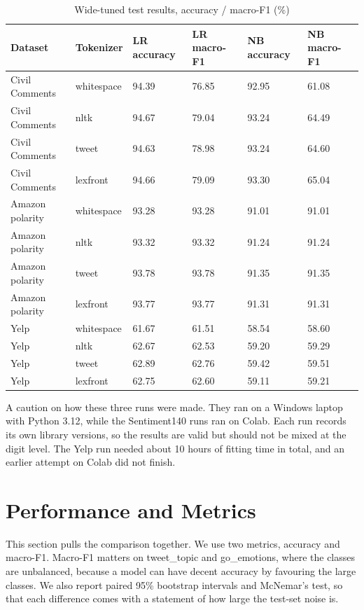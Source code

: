 \documentclass[journal,onecolumn,12pt,a4paper]{IEEEtran}
\begin{document}
\begin{table}[!tb]
\caption{Wide-tuned test results, accuracy / macro-F1 (\%)}\label{tab:12}
\centering
\footnotesize
\setlength{\tabcolsep}{4pt}
\begin{tabular}{llllll}
\toprule
\textbf{Dataset} & \textbf{Tokenizer} & \textbf{LR accuracy} & \textbf{LR macro-F1} & \textbf{NB accuracy} & \textbf{NB macro-F1} \\
\midrule
Civil Comments & whitespace & 94.39 & 76.85 & 92.95 & 61.08 \\
Civil Comments & nltk & 94.67 & 79.04 & 93.24 & 64.49 \\
Civil Comments & tweet & 94.63 & 78.98 & 93.24 & 64.60 \\
Civil Comments & lexfront & 94.66 & 79.09 & 93.30 & 65.04 \\
Amazon polarity & whitespace & 93.28 & 93.28 & 91.01 & 91.01 \\
Amazon polarity & nltk & 93.32 & 93.32 & 91.24 & 91.24 \\
Amazon polarity & tweet & 93.78 & 93.78 & 91.35 & 91.35 \\
Amazon polarity & lexfront & 93.77 & 93.77 & 91.31 & 91.31 \\
Yelp & whitespace & 61.67 & 61.51 & 58.54 & 58.60 \\
Yelp & nltk & 62.67 & 62.53 & 59.20 & 59.29 \\
Yelp & tweet & 62.89 & 62.76 & 59.42 & 59.51 \\
Yelp & lexfront & 62.75 & 62.60 & 59.11 & 59.21 \\
\bottomrule
\end{tabular}
\end{table}

A caution on how these three runs were made. They ran on a Windows laptop with Python 3.12, while the Sentiment140 runs ran on Colab. Each run records its own library versions, so the results are valid but should not be mixed at the digit level. The Yelp run needed about 10 hours of fitting time in total, and an earlier attempt on Colab did not finish.

\section{Performance and Metrics}\label{sec:5}
This section pulls the comparison together. We use two metrics, accuracy and macro-F1. Macro-F1 matters on tweet\_topic and go\_emotions, where the classes are unbalanced, because a model can have decent accuracy by favouring the large classes. We also report paired 95\% bootstrap intervals and McNemar's test, so that each difference comes with a statement of how large the test-set noise is.
\end{document}
